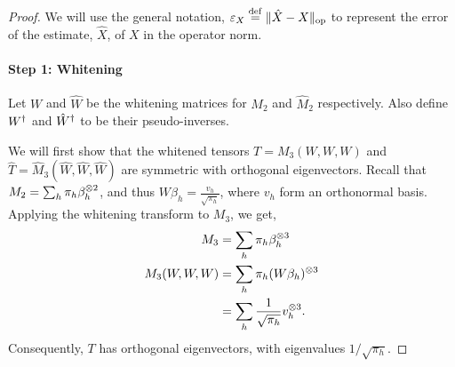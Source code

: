 \begin{proof}
We will use the general notation, $\varepsilon_{X} \stackrel{\rm def}{=} \|\hat X - X\|_{\textrm{op}}$
to represent the error of the estimate, $\hat X$, of $X$ in the operator
norm. 
\paragraph{Step 1: Whitening}
Let $W$ and $\hat W$ be the whitening matrices for $M_2$ and $\hat M_2$
respectively. Also define $W^{\dagger}$ and ${\hat W}^{\dagger}$ to be their
pseudo-inverses.

We will first show that the whitened tensors $T = M_3(W,W,W)$ and $\hat
T = \hat M_3(\hat W, \hat W, \hat W)$ are symmetric with orthogonal
eigenvectors. Recall that $M_2 = \sum_h \pi_h \beta_h^{\otimes 2}$, and thus
$W \beta_h = \frac{v_h}{\sqrt{\pi_h}}$, where $v_h$ form an orthonormal
basis. Applying the whitening transform to $M_3$, we get, 
\begin{align*}
  M_3 &= \sum_h \pi_h \beta_h^{\otimes 3} \\
  M_3(W,W,W) &= \sum_h \pi_h (W\beta_h)^{\otimes 3} \\
  &= \sum_h \frac{1}{\sqrt{\pi_h}} v_h^{\otimes 3}.
\end{align*}
Consequently, $T$ has orthogonal eigenvectors, with eigenvalues $1/\sqrt{\pi_h}$.


\end{proof}
